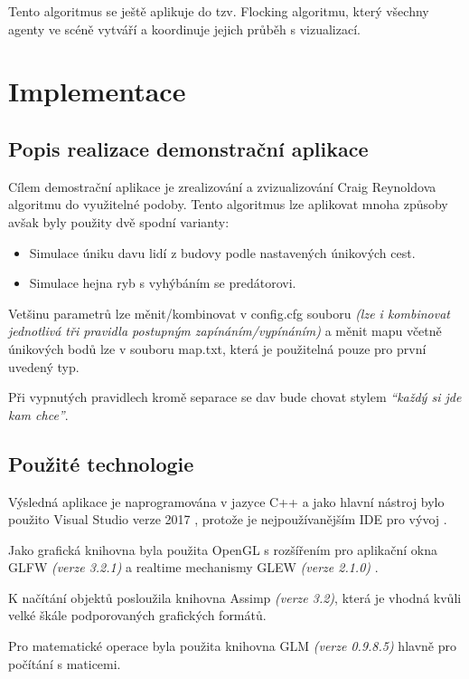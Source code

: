 \documentclass[czech,public,dept460,male,cpdeclaration]{diploma}
\begin{document}
Tento algoritmus se ještě aplikuje do tzv. Flocking algoritmu, který všechny agenty ve scéně vytváří a koordinuje jejich průběh s vizualizací.

\newpage
\section{Implementace}

\subsection{Popis realizace demonstrační aplikace}
Cílem demostrační aplikace je zrealizování a zvizualizování Craig Reynoldova algoritmu do využitelné podoby. Tento algoritmus lze aplikovat mnoha způsoby avšak byly použity dvě spodní varianty:

\begin{itemize}
	\item Simulace úniku davu lidí z budovy podle nastavených únikových cest.
	\item Simulace hejna ryb s vyhýbáním se predátorovi.
\end{itemize}

Vetšinu parametrů lze měnit/kombinovat v config.cfg souboru \textit{(lze i kombinovat jednotlivá tři pravidla postupným zapínáním/vypínáním)} a měnit mapu včetně únikových bodů lze v souboru map.txt, která je použitelná pouze pro první uvedený typ.

Při vypnutých pravidlech kromě separace se dav bude chovat stylem \textit{``každý si jde kam chce''}.

\subsection{Použité technologie}
Výsledná aplikace je naprogramována v jazyce C++ a jako hlavní nástroj bylo použito Visual Studio verze 2017 \cite{linkToVisualStudio}, protože je nejpoužívanějším IDE pro vývoj \cite{linkToTopIDE}. 

Jako grafická knihovna byla použita OpenGL \cite{linkToOpenGL} s rozšířením pro aplikační okna GLFW \textit{(verze 3.2.1)} \cite{linkToGLFW} a realtime mechanismy GLEW \textit{(verze 2.1.0)} \cite{linkToGLew}.

K načítání objektů posloužila knihovna Assimp \cite{linkToAssimp} \textit{(verze 3.2)}, která je vhodná kvůli velké škále podporovaných grafických formátů.

Pro matematické operace byla použita knihovna GLM \cite{linkToGLM} \textit{(verze 0.9.8.5)} hlavně pro počítání s maticemi.
\end{document}
